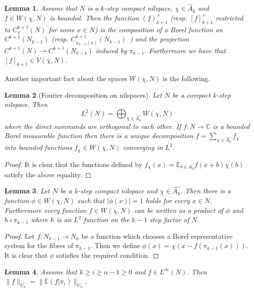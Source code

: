 \documentclass [11pt] {article}
\newtheorem{lemma}{Lemma}[section]
\begin{document}
\begin{lemma}\label{nilspcharderiv} Assume that $N$ is a $k$-step compact nilspace, $\chi\in\hat{A}_k$ and $f\in W(\chi,N)$ is bounded. Then the function $(f)_{k+1}^\times$ (resp. $[f]_{k+1}^\times$ restricted to $C^{k+1}_x(N)$ for some $x\in N$) is the composition of a Borel function on $C^{k+1}(N_{k-1})$ (resp. $C^{k+1}_{\pi_{k-1}(x)}(N_{k-1})$~) and the projection $C^{k+1}(N)\rightarrow C^{k+1}(N_{k-1})$ induced by $\pi_{k-1}$.
Furthermore we have that $[f]_{k+1}\in V(\overline{\chi},N)$.
\end{lemma}

Another important fact about the spaces $W(\chi,N)$ is the following.

\begin{lemma}[Fourier decomposition on nilspaces]\label{nilfourdec} Let $N$ be a compact $k$-step nilspace. Then $$L^2(N)=\bigoplus_{\chi\in\hat{A_k}}W(\chi,N)$$ where the direct summands are orthogonal to each other. If $f:N\rightarrow\mathbb{C}$ is a bounded Borel measurable function then there is a unique decomposition
$f=\sum_{\chi\in\hat{A_k}}f_\chi$ into bounded functions $f_\chi\in W(\chi,N)$
converging in $L^2$. 
\end{lemma}

\begin{proof} It is clear that the functions defined by $f_\chi(x)=\mathbb{E}_{b\in A_k}f(x+b)\overline{\chi(b)}$ satisfy the above equality. 
\end{proof}

\begin{lemma}\label{nilspchar} Let $N$ be a $k$-step compact nilspace and $\chi\in\hat{A_k}$. Then there is a function $\phi\in W(\chi,N)$ such that $|\phi(x)|=1$ holds for every $x\in N$. Furthermore every function $f\in W(\chi,N)$ can be written as a product of $\phi$ and $h\circ\pi_{k-1}$ where $h$ is an $L^2$ function on the $k-1$ step factor of $N$.
\end{lemma}

\begin{proof} Let $f:N_{k-1}\rightarrow N_k$ be a function which chooses a Borel representative system for the fibres of $\pi_{k-1}$. Then we define $\phi(x)=\chi(x-f(\pi_{k-1}(x)))$. It is clear that $\phi$ satisfies the required condition.
\end{proof}

\begin{lemma}\label{gownilproj} Assume that $k\geq i\geq n-1\geq 0$ and $f\in L^\infty(N)$. Then $\|f\|_{U_n}=\|\mathbb{E}(f|\pi_i)\|_{U_n}$.
\end{lemma}
\end{document}
